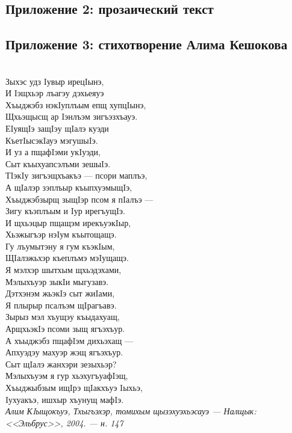 \subsection{Приложение 2: прозаический текст} \label{text}
\subsection{Приложение 3: стихотворение Алима Кешокова} \label{verse}
{~}\medskip\\
\noindent Зыхэс удз Iувыр ирецIынэ,\\
И Iэщхьэр лъагэу дэхьеяуэ\\
Хъыджэбз нэкIуплъым епщ хупцIынэ,\\
Щхьэщысщ ар Iэнлъэм зигъэзхъауэ.\medskip\\
ЕIуящIэ защIэу щIалэ куэди\\
КъетIысэкIауэ мэгушыIэ.\\
И уз а пщафIэми укIуэди,\\
Сыт къыхуапсэлъми зешыIэ.\medskip\\
ТIэкIу зигъэщхъакъэ --- псори маплъэ,\\
А щIалэр зэплъыр къыпхуэмыщIэ,\\
Хъыджэбзырщ зыщIэр псом я пIалъэ ---\\
Зигу къэплъым и Iур ирегъущIэ.\medskip\\
И щхьэцыр пщащэм ирекъуэкIыр,\\
Хьэжыгъэр нэIум къытощащэ.\\
Гу лъумытэну я гум къэкIым,\\
ЩIалэжьхэр къеплъмэ мэIущащэ.\medskip\\
Я мэлхэр шытхым щхьэдэхами,\\
Мэлыхъуэр зыкIи мыгузавэ.\\
Дэтхэнэм жьэкIэ сыт жиIами,\\
Я плырыр псалъэм щIрагъавэ.\medskip\\
Зырыз мэл хъущэу къыдахуащ,\\
АрщхьэкIэ псоми зыщ ягъэхъур.\\
А хъыджэбз пщафIэм дихьэхащ --- \\
Апхуэдэу махуэр жэщ ягъэхъур. \medskip\\
Сыт щIалэ жанхэри зезыхьэр?\\
Мэлыхъуэм я гур хьэхугъуафIэщ,\\
Хъыджыбзым ищIрэ щIакхъуэ Iыхьэ,\\
Iухуакъэ, ишхыр хъунущ мафIэ.\medskip\\
\textit{Алим КIыщокъуэ, Тхыгъэхэр, томихым щызэхуэхьэсауэ ---  Налщык: <<Эльбрус>>, 2004. --- н. 147}
\pagebreak
